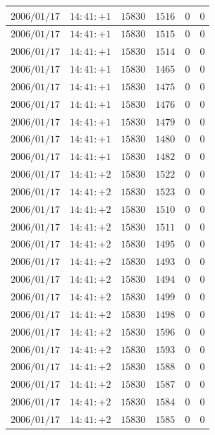 \documentclass[a4j,papersize,disablejfam,slide,14pt]{jsarticle}
\begin{document}
\begin{description}
\begin{center}
\begin{longtable}{|l|l|l|l|l|l|}
					$2006/01/17$ & $14:41:+1$  & $15830$ & $1516$ & $0$ & $0$ \\ \hline
					$2006/01/17$ & $14:41:+1$  & $15830$ & $1515$ & $0$ & $0$ \\ \hline
					$2006/01/17$ & $14:41:+1$  & $15830$ & $1514$ & $0$ & $0$ \\ \hline
					$2006/01/17$ & $14:41:+1$  & $15830$ & $1465$ & $0$ & $0$ \\ \hline
					$2006/01/17$ & $14:41:+1$  & $15830$ & $1475$ & $0$ & $0$ \\ \hline
					$2006/01/17$ & $14:41:+1$  & $15830$ & $1476$ & $0$ & $0$ \\ \hline
					$2006/01/17$ & $14:41:+1$  & $15830$ & $1479$ & $0$ & $0$ \\ \hline
					$2006/01/17$ & $14:41:+1$  & $15830$ & $1480$ & $0$ & $0$ \\ \hline
					$2006/01/17$ & $14:41:+1$  & $15830$ & $1482$ & $0$ & $0$ \\ \hline
					$2006/01/17$ & $14:41:+2$  & $15830$ & $1522$ & $0$ & $0$ \\ \hline
					$2006/01/17$ & $14:41:+2$  & $15830$ & $1523$ & $0$ & $0$ \\ \hline
					$2006/01/17$ & $14:41:+2$  & $15830$ & $1510$ & $0$ & $0$ \\ \hline
					$2006/01/17$ & $14:41:+2$  & $15830$ & $1511$ & $0$ & $0$ \\ \hline
					$2006/01/17$ & $14:41:+2$  & $15830$ & $1495$ & $0$ & $0$ \\ \hline
					$2006/01/17$ & $14:41:+2$  & $15830$ & $1493$ & $0$ & $0$ \\ \hline
					$2006/01/17$ & $14:41:+2$  & $15830$ & $1494$ & $0$ & $0$ \\ \hline
					$2006/01/17$ & $14:41:+2$  & $15830$ & $1499$ & $0$ & $0$ \\ \hline
					$2006/01/17$ & $14:41:+2$  & $15830$ & $1498$ & $0$ & $0$ \\ \hline
					$2006/01/17$ & $14:41:+2$  & $15830$ & $1596$ & $0$ & $0$ \\ \hline
					$2006/01/17$ & $14:41:+2$  & $15830$ & $1593$ & $0$ & $0$ \\ \hline
					$2006/01/17$ & $14:41:+2$  & $15830$ & $1588$ & $0$ & $0$ \\ \hline
					$2006/01/17$ & $14:41:+2$  & $15830$ & $1587$ & $0$ & $0$ \\ \hline
					$2006/01/17$ & $14:41:+2$  & $15830$ & $1584$ & $0$ & $0$ \\ \hline
					$2006/01/17$ & $14:41:+2$  & $15830$ & $1585$ & $0$ & $0$ \\ \hline

\end{longtable}
\end{center}
\end{description}
\end{document}
